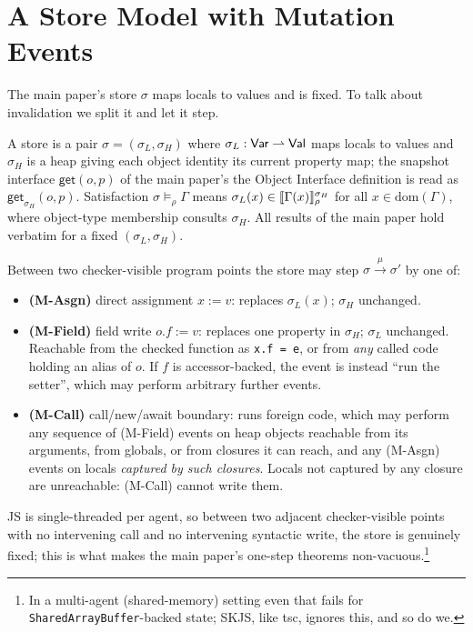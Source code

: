 \documentclass[11pt]{article}
\newcommand{\Env}{\Gamma}
\begin{document}
\section{A Store Model with Mutation Events}
\label{sec:model}

The main paper's store $\sigma$ maps locals to values and is fixed. To
talk about invalidation we split it and let it step.

\begin{definition}
\label{def:store}
A store is a pair $\sigma = (\sigma_L, \sigma_H)$ where
$\sigma_L : \mathsf{Var} \rightharpoonup \mathsf{Val}$ maps locals to values and
$\sigma_H$ is a heap giving each object identity its current property
map; the snapshot interface $\mathsf{get}(o, p)$ of the main paper's
the Object Interface definition is read as
$\mathsf{get}_{\sigma_H}(o, p)$. Satisfaction
$\sigma \models_\rho \Env$ means
$\sigma_L(x) \in \sem{\Env(x)}^{\sigma_H}_\rho$ for all
$x \in \mathrm{dom}(\Env)$, where object-type membership consults
$\sigma_H$. All results of the main paper hold verbatim for a fixed
$(\sigma_L, \sigma_H)$.
\end{definition}

\begin{definition}
\label{def:events}
Between two checker-visible program points the store may step
$\sigma \xrightarrow{\mu} \sigma'$ by one of:
\begin{itemize}
\item \textbf{(M-Asgn)} direct assignment $x := v$: replaces
  $\sigma_L(x)$; $\sigma_H$ unchanged.
\item \textbf{(M-Field)} field write $o.f := v$: replaces one property in
  $\sigma_H$; $\sigma_L$ unchanged. Reachable from the checked function as
  \texttt{x.f = e}, or from \emph{any} called code holding an alias of
  $o$. If $f$ is accessor-backed, the event is instead ``run the setter'',
  which may perform arbitrary further events.
\item \textbf{(M-Call)} call/new/await boundary: runs foreign code, which
  may perform any sequence of (M-Field) events on heap objects reachable
  from its arguments, from globals, or from closures it can reach, and any
  (M-Asgn) events on locals \emph{captured by such closures}. Locals not
  captured by any closure are unreachable: (M-Call) cannot write them.
\end{itemize}
JS is single-threaded per agent, so between two adjacent checker-visible
points with no intervening call and no intervening syntactic write, the
store is genuinely fixed; this is what makes the main paper's one-step
theorems non-vacuous.\footnote{In a multi-agent (shared-memory) setting
even that fails for \texttt{SharedArrayBuffer}-backed state; SKJS, like
tsc, ignores this, and so do we.}
\end{definition}
\end{document}
